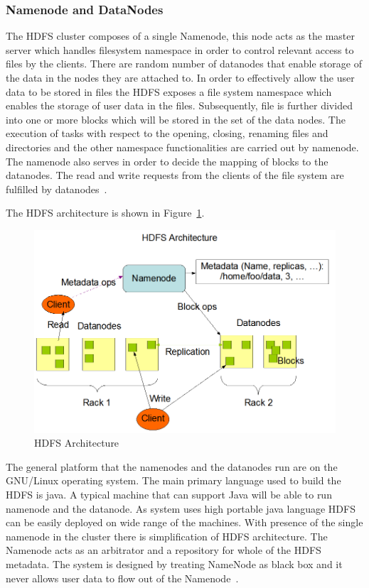 \subsubsection{Namenode and DataNodes}
The HDFS cluster composes of a single Namenode, this node acts as 
the master server which
 handles filesystem namespace in order to control 
relevant access to files by the clients.
There are random number of datanodes that enable 
storage of the data in the nodes
 they are attached to. In order to effectively allow the 
user data to be stored in
 files the HDFS exposes a file system namespace which 
enables the storage of user 
 data in the files. Subsequently, file is further 
divided into one or more blocks 
 which will be stored in the set of the data nodes. 
The execution of tasks with 
 respect to the opening, closing, renaming files and directories and the other 
 namespace functionalities are carried out by namenode. The namenode also 
 serves in order to decide the mapping of blocks to the datanodes. 
 The read and write requests from the clients of the file system
  are fulfilled by datanodes~\cite{hid-sp18-412-HDFS-Architecture}.

The HDFS architecture is shown in Figure~\ref{s:archihdfs}.

\begin{figure}[!ht]
\centering\includegraphics[width=\textwidth]{images/HDFSarchi.png}
\caption{HDFS 
Architecture~\cite{hid-sp18-412-HDFS-Architecture}}\label{s:archihdfs}
\end{figure}

The general platform that the namenodes and the datanodes run are on 
the GNU/Linux operating system. The main primary language used to 
build the HDFS is java. A typical machine that can support  
Java will be able to run namenode and the datanode. As  
system uses high portable java language HDFS can be 
easily deployed on wide range of the machines. With  
presence of the single namenode in the cluster there is simplification 
of HDFS architecture. The Namenode acts as an arbitrator 
and a repository for whole of the HDFS metadata. 
The system is designed by treating NameNode as 
black box and it never allows user 
data to flow out of the Namenode~\cite{hid-sp18-412-HDFS-Architecture}.

